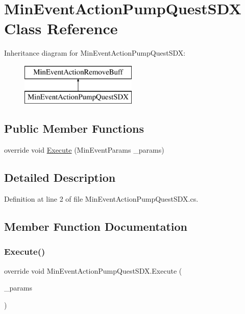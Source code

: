 \hypertarget{class_min_event_action_pump_quest_s_d_x}{}\section{Min\+Event\+Action\+Pump\+Quest\+S\+DX Class Reference}
\label{class_min_event_action_pump_quest_s_d_x}
Inheritance diagram for Min\+Event\+Action\+Pump\+Quest\+S\+DX\+:\begin{figure}[H]
\begin{center}
\leavevmode
\includegraphics[height=2.000000cm]{class_min_event_action_pump_quest_s_d_x}
\end{center}
\end{figure}
\subsection*{Public Member Functions}
\begin{DoxyCompactItemize}
\item 
override void \mbox{\hyperlink{class_min_event_action_pump_quest_s_d_x_a7fd2a6299222d8641d67f0152877e89c}{Execute}} (Min\+Event\+Params \+\_\+params)
\end{DoxyCompactItemize}


\subsection{Detailed Description}


Definition at line 2 of file Min\+Event\+Action\+Pump\+Quest\+S\+D\+X.\+cs.



\subsection{Member Function Documentation}
\mbox{\label{class_min_event_action_pump_quest_s_d_x_a7fd2a6299222d8641d67f0152877e89c}} 
\subsubsection{\texorpdfstring{Execute()}{Execute()}}
{\footnotesize\ttfamily override void Min\+Event\+Action\+Pump\+Quest\+S\+D\+X.\+Execute (\begin{DoxyParamCaption}\item[{Min\+Event\+Params}]{\+\_\+params }\end{DoxyParamCaption})}



